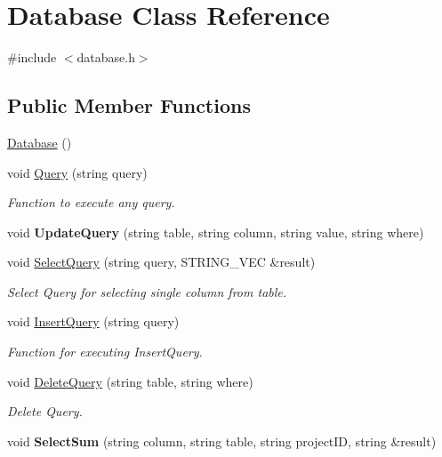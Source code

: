 \hypertarget{classDatabase}{\section{Database Class Reference}
\label{classDatabase}
}


{\ttfamily \#include $<$database.\-h$>$}

\subsection*{Public Member Functions}
\begin{DoxyCompactItemize}
\item 
\hyperlink{classDatabase_a4703c80e6969d33565ea340f768fdadf}{Database} ()
\item 
\hypertarget{classDatabase_ab790a68bd8fdbd36133d56ca21ec45d0}{void \hyperlink{classDatabase_ab790a68bd8fdbd36133d56ca21ec45d0}{Query} (string query)}\label{classDatabase_ab790a68bd8fdbd36133d56ca21ec45d0}

\begin{DoxyCompactList}\small\item\em Function to execute any query. \end{DoxyCompactList}\item 
\hypertarget{classDatabase_adab1d6cc97c8b14e9d170d5659a92d3e}{void {\bfseries Update\-Query} (string table, string column, string value, string where)}\label{classDatabase_adab1d6cc97c8b14e9d170d5659a92d3e}

\item 
void \hyperlink{classDatabase_a4ccf07a8481a83055d8ce5fd27f0b415}{Select\-Query} (string query, S\-T\-R\-I\-N\-G\-\_\-\-V\-E\-C \&result)
\begin{DoxyCompactList}\small\item\em Select Query for selecting single column from table. \end{DoxyCompactList}\item 
void \hyperlink{classDatabase_a63d8c1af7507b1dcdc81a411f9a0b4b4}{Insert\-Query} (string query)
\begin{DoxyCompactList}\small\item\em Function for executing Insert\-Query. \end{DoxyCompactList}\item 
void \hyperlink{classDatabase_a3ae42b73dea23470871c86af6b50bbf2}{Delete\-Query} (string table, string where)
\begin{DoxyCompactList}\small\item\em Delete Query. \end{DoxyCompactList}\item 
\hypertarget{classDatabase_af237df2de117cf94e23d288ad3345ca0}{void {\bfseries Select\-Sum} (string column, string table, string project\-I\-D, string \&result)}\label{classDatabase_af237df2de117cf94e23d288ad3345ca0}


\end{DoxyCompactItemize}
